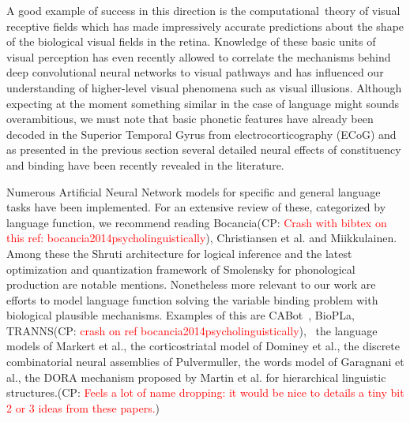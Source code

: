 \documentclass[10pt]{article}
\newcommand{\noteCP}[1]{(CP: \textcolor{red}{#1})}
\begin{document}
A good example of success in this direction is the
computational~theory of visual receptive
fields\cite{lindeberg2017normative} which has made impressively accurate
predictions about the shape of the biological visual fields in the
retina. Knowledge of these basic units of visual perception has
even recently allowed to correlate the mechanisms behind deep
convolutional neural networks to visual
pathways\cite{Guclu_2015,Eickenberg_2017} and has influenced our
understanding of higher-level visual phenomena such as visual
illusions\cite{Eagleman_2001}. Although expecting at the moment
something similar in the case of language might sounds overambitious,
we must note that basic phonetic features have already been decoded in
the Superior Temporal Gyrus from electrocorticography
(ECoG)\cite{Mesgarani_2014} and as presented in the previous section several detailed neural effects of constituency and binding have been recently revealed in the literature.


Numerous Artificial Neural Network models for specific and general
language tasks have been implemented. For an extensive review of
these, categorized by language function, we recommend reading
Bocancia\noteCP{Crash with bibtex on this ref:
  bocancia2014psycholinguistically}, Christiansen et
al.\cite{Christiansen_1999} and
Miikkulainen\cite{miikkulainen1997natural}. Among these the Shruti
architecture for logical inference\cite{Wendelken_2004} and the latest
optimization and quantization framework of Smolensky for phonological
production\cite{Smolensky_2013} are notable mentions. Nonetheless more
relevant to our work are efforts to model language function solving
the variable binding problem with biological plausible mechanisms.
Examples of this are CABot~\cite{Huyck_2009},
BioPLa\cite{Garcia_Rosa}, TRANNS\noteCP{crash on ref
  {bocancia2014psycholinguistically}}, ~the language models of Markert
et al.\cite{Markert_2007}, the corticostriatal model of Dominey et
al.\cite{Dominey_2009}, the discrete combinatorial neural assemblies
of Pulvermuller\cite{Pulverm_ller_2009,Pulverm_ller_2010}, the words
model of Garagnani et al.\cite{Garagnani_2017}, the DORA mechanism
proposed by Martin et al. for hierarchical linguistic
structures\cite{Martin_2017}.\noteCP{Feels a lot of name dropping: it
  would be nice to details a tiny bit 2 or 3 ideas from these papers.}
\end{document}
